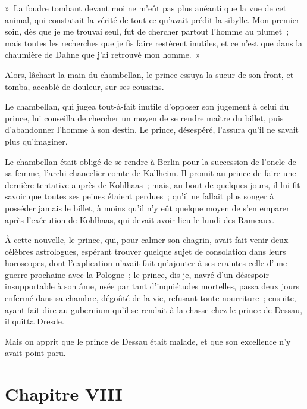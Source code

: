 \documentclass[french,twoside]{book} %
\newcommand\chapteropen{} %
\newcommand\chapterclose{} %
\begin{document}
» La foudre tombant devant moi ne m’eût pas plus anéanti que la vue de cet animal, qui constatait la vérité de tout ce qu’avait prédit la sibylle. Mon premier soin, dès que je me trouvai seul, fut de chercher partout l’homme au plumet ; mais toutes les recherches que je fis faire restèrent inutiles, et ce n’est que dans la chaumière de Dahne que j’ai retrouvé mon homme. »\par
Alors, lâchant la main du chambellan, le prince essuya la sueur de son front, et tomba, accablé de douleur, sur ses coussins.\par
Le chambellan, qui jugea tout-à-fait inutile d’opposer son jugement à celui du prince, lui conseilla de chercher un moyen de se rendre maître du billet, puis d’abandonner l’homme à son destin. Le prince, désespéré, l’assura qu’il ne savait plus qu’imaginer.\par
Le chambellan était obligé de se rendre à Berlin pour la succession de l’oncle de sa femme, l’archi-chancelier comte de Kallheim. Il promit au prince de faire une dernière tentative auprès de Kohlhaas ; mais, au bout de quelques jours, il lui fit savoir que toutes ses peines étaient perdues ; qu’il ne fallait plus songer à posséder jamais le billet, à moins qu’il n’y eût quelque moyen de s’en emparer après l’exécution de Kohlhaas, qui devait avoir lieu le lundi des Rameaux.\par
À cette nouvelle, le prince, qui, pour calmer son chagrin, avait fait venir deux célèbres astrologues, espérant trouver quelque sujet de consolation dans leurs horoscopes, dont l’explication n’avait fait qu’ajouter à ses craintes celle d’une guerre prochaine avec la Pologne ; le prince, dis-je, navré d’un désespoir insupportable à son âme, usée par tant d’inquiétudes mortelles, passa deux jours enfermé dans sa chambre, dégoûté de la vie, refusant toute nourriture ; ensuite, ayant fait dire au gubernium qu’il se rendait à la chasse chez le prince de Dessau, il quitta Dresde.\par
Mais on apprit que le prince de Dessau était malade, et que son excellence n’y avait point paru.
\chapterclose


\chapteropen
\chapter[Chapitre VIII]{Chapitre VIII}\renewcommand{\leftmark}{Chapitre VIII}
\end{document}
